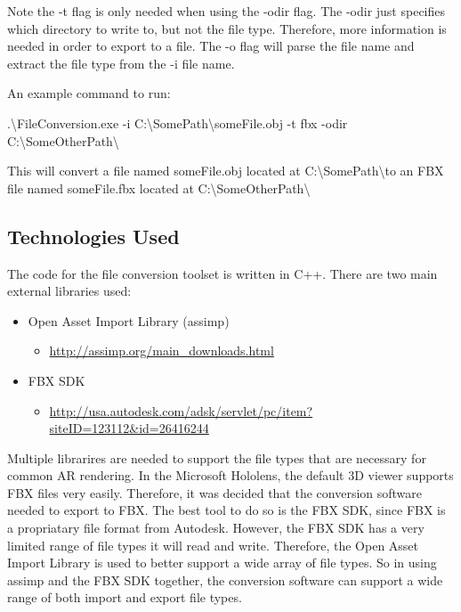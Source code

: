     Note the -t flag is only needed when using the -odir flag.  The -odir just specifies which directory to write to, but not the file type.
    Therefore, more information is needed in order to export to a file.  The -o flag will parse the file name and extract the file type from the -i file name.

    An example command to run:

    \begin{center}
        .\textbackslash FileConversion.exe -i C:\textbackslash SomePath\textbackslash someFile.obj -t fbx -odir C:\textbackslash SomeOtherPath\textbackslash
    \end{center}

    This will convert a file named someFile.obj located at C:\textbackslash SomePath\textbackslash  to an FBX file named someFile.fbx located at 
    C:\textbackslash SomeOtherPath\textbackslash

    \subsection{Technologies Used}

    The code for the file conversion toolset is written in C++.  There are two main external libraries used:
    \begin{itemize}
        \item Open Asset Import Library (assimp)
        \begin{itemize}
            \item \url{http://assimp.org/main_downloads.html}
        \end{itemize}

        \item FBX SDK
        \begin{itemize}
            \item \url{http://usa.autodesk.com/adsk/servlet/pc/item?siteID=123112&id=26416244}
        \end{itemize}
    \end{itemize}

    Multiple librarires are needed to support the file types that are necessary for common AR rendering.  In the Microsoft Hololens, the default
    3D viewer supports FBX files very easily.  Therefore, it was decided that the conversion software needed to export to FBX.  The best tool to do 
    so is the FBX SDK, since FBX is a propriatary file format from Autodesk.  However, the FBX SDK has a very limited range of file types it will read and write.
    Therefore, the Open Asset Import Library is used to better support a wide array of file types.  So in using assimp and the FBX SDK together,
    the conversion software can support a wide range of both import and export file types.


